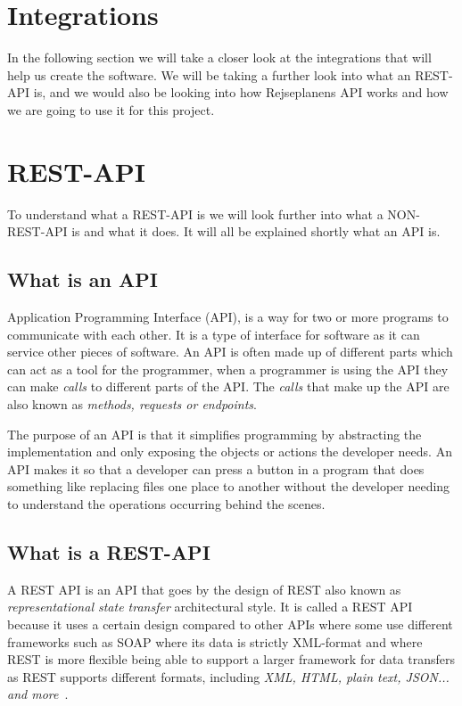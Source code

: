 \section{Integrations}\label{sec:integrations}

In the following section we will take a closer look at the integrations that will help us create the software.
We will be taking a further look into what an REST-API is, and we would also be looking into how Rejseplanens API works
and how we are going to use it for this project.


\section{REST-API}\label{sec:rest-api}

To understand what a REST-API is we will look further into what a NON-REST-API is and what it does.
It will all be explained shortly what an API is.

\subsection{What is an API}\label{subsec:what-is-an-api}

Application Programming Interface (API), is a way for two or more programs to communicate with each other.
It is a type of interface for software as it can service other pieces of software.
An API is often made up of different parts which can act as a tool for the programmer, when a programmer is using the
API they can make \textit{calls} to different parts of the API\@.
The \textit{calls} that make up the API are also known as \textit{methods, requests or endpoints}. \cite{APIwiki}

The purpose of an API is that it simplifies programming by abstracting the implementation and only exposing the objects
or actions the developer needs.
An API makes it so that a developer can press a button in a program that does something like replacing files one place
to another without the developer needing to understand the operations occurring behind the scenes.

\subsection{What is a REST-API}\label{subsec:what-is-a-rest-api}

A REST API is an API that goes by the design of REST also known as \textit{representational state transfer}
architectural style.
It is called a REST API because it uses a certain design compared to other APIs where some use different frameworks
such as SOAP where its data is strictly XML-format and where REST is more flexible being able to support a larger
framework for data transfers as REST supports different formats, including \textit{XML, HTML, plain text, JSON... and
more}~\cite{IBMrestapi}.


